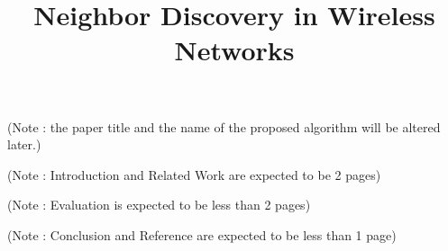 \documentclass[conference]{IEEEtran}
\begin{document}
\title{Neighbor Discovery in Wireless Networks}




%




\maketitle

(Note : the paper title and the name of the proposed algorithm will be altered later.)
\vspace{3mm}



\IEEEpeerreviewmaketitle





\vspace{3mm}
(Note : Introduction and Related Work are expected to be 2 pages)









(Note : Evaluation is expected to be less than 2 pages)






\vspace{3mm}
(Note : Conclusion and Reference are expected to be less than 1 page)
\end{document}
